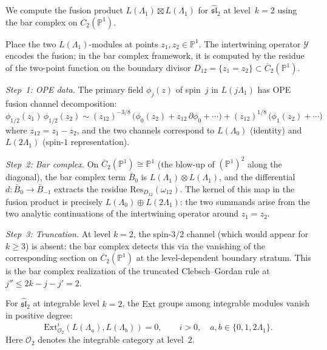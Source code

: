 \begin{example}
\label{ex:fusion-bar-sl2}
We compute the fusion product $L(\Lambda_1) \boxtimes L(\Lambda_1)$
for $\widehat{\mathfrak{sl}}_2$ at level~$k=2$ using the bar
complex on $\overline{C}_2(\mathbb{P}^1)$.

Place the two $L(\Lambda_1)$-modules at points $z_1, z_2 \in
\mathbb{P}^1$.  The intertwining operator $\mathcal{Y}$ encodes
the fusion; in the bar complex framework, it is computed by the
residue of the two-point function on the boundary divisor
$D_{12} = \{z_1 = z_2\} \subset \overline{C}_2(\mathbb{P}^1)$.

\emph{Step~1: OPE data.}
The primary field $\phi_j(z)$ of spin~$j$ in $L(j\Lambda_1)$ has
OPE fusion channel decomposition:
\[
\phi_{1/2}(z_1)\, \phi_{1/2}(z_2)
\sim (z_{12})^{-3/8}\, \bigl(
\phi_0(z_2) + z_{12}\, \partial\phi_0
+ \cdots
\bigr)
+ (z_{12})^{1/8}\, \bigl(
\phi_1(z_2) + \cdots
\bigr)
\]
where $z_{12} = z_1 - z_2$, and the two channels correspond
to $L(\Lambda_0)$ (identity) and $L(2\Lambda_1)$ (spin-$1$
representation).

\emph{Step~2: Bar complex.}
On $\overline{C}_2(\mathbb{P}^1) \cong \mathbb{P}^1$
(the blow-up of $(\mathbb{P}^1)^2$ along the diagonal), the
bar complex term $\bar{B}_0$ is
$L(\Lambda_1) \otimes L(\Lambda_1)$, and the differential
$d\colon \bar{B}_0 \to \bar{B}_{-1}$ extracts the residue
$\mathrm{Res}_{D_{12}}(\omega_{12})$.  The kernel of this
map in the fusion product is precisely
$L(\Lambda_0) \oplus L(2\Lambda_1)$: the two summands arise
from the two analytic continuations of the intertwining
operator around $z_1 = z_2$.

\emph{Step~3: Truncation.}
At level $k = 2$, the spin-$3/2$ channel
(which would appear for $k \geq 3$) is absent: the bar complex
detects this via the vanishing of the corresponding section on
$\overline{C}_2(\mathbb{P}^1)$ at the level-dependent boundary
stratum.  This is the bar complex realization of the truncated
Clebsch--Gordan rule at $j'' \leq 2k - j - j' = 2$.
\end{example}

\begin{proposition}
\label{prop:ext-sl2-level2}
For $\widehat{\mathfrak{sl}}_2$ at integrable level $k = 2$, the
$\mathrm{Ext}$ groups among integrable modules vanish in positive
degree:
\begin{equation}\label{eq:ext-sl2-level2}
\mathrm{Ext}^i_{\mathcal{O}_2}(L(\Lambda_a), L(\Lambda_b)) = 0,
\qquad i > 0,\quad a, b \in \{0, 1, 2\Lambda_1\}.
\end{equation}
Here $\mathcal{O}_2$ denotes the integrable category at level~$2$.
\end{proposition}

